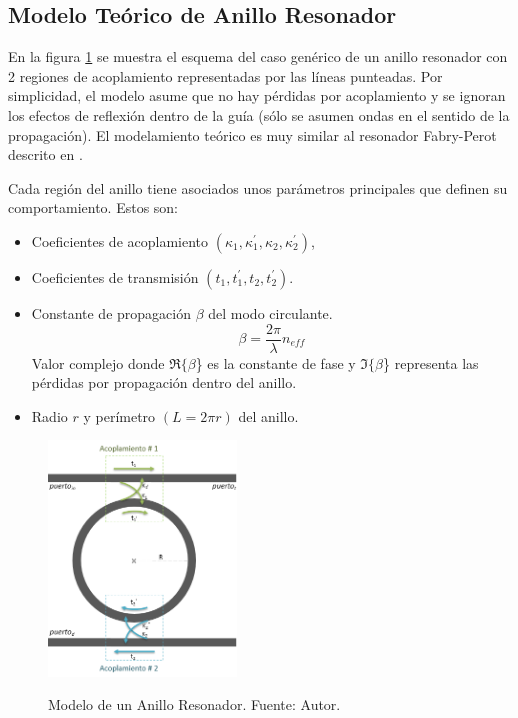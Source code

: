 \documentclass{IEEEtran}
\begin{document}
\subsection{Modelo Teórico de Anillo Resonador}
\label{ss:generic_theory}

En la figura \ref{fig:rr_model} se muestra el esquema del caso genérico de 
un anillo resonador con 2 regiones de acoplamiento representadas 
por las líneas punteadas. 
Por simplicidad, el modelo asume que no hay pérdidas por 
acoplamiento y se ignoran los efectos de reflexión 
dentro de la guía (sólo se asumen ondas en el sentido de la propagación). 
El modelamiento teórico es muy similar al resonador Fabry-Perot descrito en
\cite{verdeyen1989laser}.

Cada región del anillo tiene asociados unos parámetros principales que definen su 
comportamiento. Estos son:
\begin{itemize}
\item Coeficientes de acoplamiento $(\kappa_1,\kappa_1^{'},\kappa_2,\kappa_2^{'})$,
\item Coeficientes de transmisión $(t_1, t_1^{'}, t_2, t_2^{'})$. 
\item Constante de propagación $\beta$ del modo circulante. 
\begin{equation}
\beta=\frac{2 \pi}{\lambda} n_{eff}
\label{eq:beta}
\end{equation} 
Valor complejo donde $\Re\{\beta$\} es la constante de fase 
y $\Im\{\beta$\} representa las pérdidas por propagación
dentro del anillo.
\item Radio $r$ y perímetro $(L=2 \pi r)$ del anillo.
\end{itemize} 

\begin{figure}
\caption{Modelo de un Anillo Resonador. Fuente: Autor.}
\centering
\includegraphics[width=5cm,natwidth=396,natheight=495]{figs/rr_model.PNG}
\label{fig:rr_model}
\end{figure} 
\end{document}
